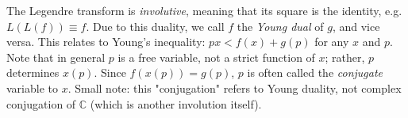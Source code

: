 
The Legendre transform is \textit{involutive}, meaning that its square is the identity, e.g. $L(L(f))\equiv f$. Due to this duality, we call $f$ the \textit{Young dual} of $g$, and vice versa. This relates to Young's inequality: $px <f(x) + g(p)$ for any $x$ and $p$. Note that in general $p$ is a free variable, not a strict function of $x$; rather, $p$ determines $x(p)$. Since $f(x(p)) = g(p)$, $p$ is often called the \textit{conjugate} variable to $x$. Small note: this "conjugation" refers to Young duality, not complex conjugation of $\mathbb{C}$ (which is another involution itself).



